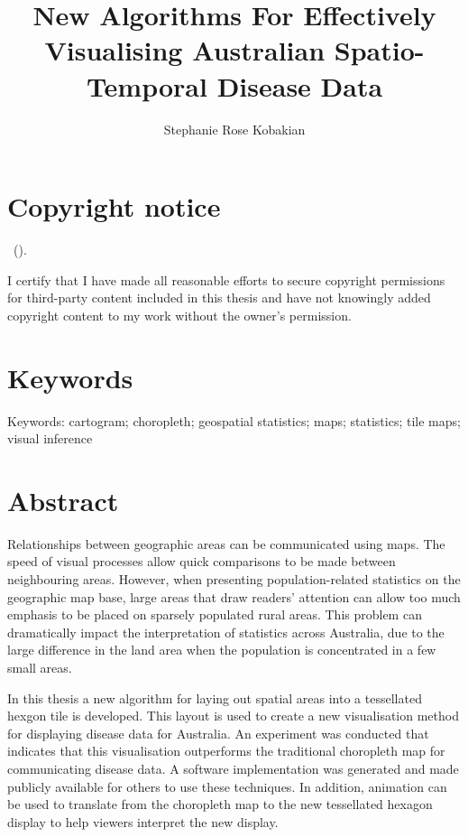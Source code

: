 \documentclass{monashthesis}
\author{Stephanie Rose Kobakian}
\title{New Algorithms For Effectively Visualising Australian Spatio-Temporal Disease Data}
\begin{document}

\titlepage

{\sf\tighttoc\doublespacing}

\hypertarget{copyright-notice}{%
\chapter*{Copyright notice}\label{copyright-notice}}

\textcopyright { } \authorname~(\number\the\year).

I certify that I have made all reasonable efforts to secure copyright permissions for third-party content included in this thesis and have not knowingly added copyright content to my work without the owner's permission.

\newpage

\hypertarget{keywords}{%
\chapter*{Keywords}\label{keywords}}

Keywords:
cartogram; choropleth; geospatial statistics; maps; statistics; tile maps; visual inference

\hypertarget{abstract}{%
\chapter*{Abstract}\label{abstract}}

Relationships between geographic areas can be communicated using maps. The speed of visual processes allow quick comparisons to be made between neighbouring areas. However, when presenting population-related statistics on the geographic map base, large areas that draw readers' attention can allow too much emphasis to be placed on sparsely populated rural areas.
This problem can dramatically impact the interpretation of statistics across Australia, due to the large difference in the land area when the population is concentrated in a few small areas.

In this thesis a new algorithm for laying out spatial areas into a tessellated hexgon tile is developed. This layout is used to create a new visualisation method for displaying disease data for Australia.
An experiment was conducted that indicates that this visualisation outperforms the traditional choropleth map for communicating disease data.
A software implementation was generated and made publicly available for others to use these techniques. In addition, animation can be used to translate from the choropleth map to the new tessellated hexagon display to help viewers interpret the new display.
\end{document}

